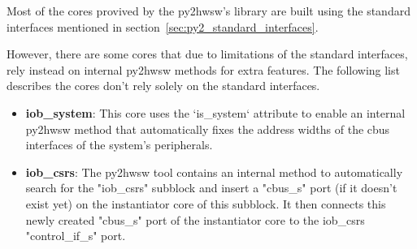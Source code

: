 %

Most of the cores provived by the py2hwsw's library are built using the standard interfaces mentioned in section~\ref{sec:py2_standard_interfaces}.

However, there are some cores that due to limitations of the standard interfaces, rely instead on internal py2hwsw methods for extra features.
The following list describes the cores don't rely solely on the standard interfaces.

\begin{itemize}
\item \textbf{iob\_system}: This core uses the `is\_system` attribute to enable an internal py2hwsw method that automatically fixes the address widths of the cbus interfaces of the system's peripherals.
\item \textbf{iob\_csrs}: The py2hwsw tool contains an internal method to automatically search for the "iob\_csrs" subblock and insert a "cbus\_s" port (if it doesn't exist yet) on the instantiator core of this subblock. It then connects this newly created "cbus\_s" port of the instantiator core to the iob\_csrs "control\_if\_s" port.
\end{itemize}


